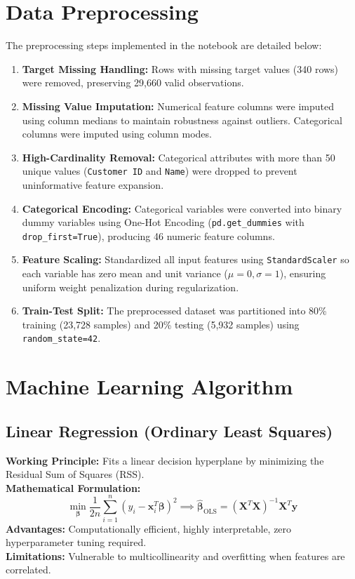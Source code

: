 \documentclass[12pt,a4paper]{article}
\begin{document}
\section{Data Preprocessing}
The preprocessing steps implemented in the notebook are detailed below:
\begin{enumerate}
    \item \textbf{Target Missing Handling:} Rows with missing target values (340 rows) were removed, preserving 29,660 valid observations.
    \item \textbf{Missing Value Imputation:} Numerical feature columns were imputed using column medians to maintain robustness against outliers. Categorical columns were imputed using column modes.
    \item \textbf{High-Cardinality Removal:} Categorical attributes with more than 50 unique values (\texttt{Customer ID} and \texttt{Name}) were dropped to prevent uninformative feature expansion.
    \item \textbf{Categorical Encoding:} Categorical variables were converted into binary dummy variables using One-Hot Encoding (\texttt{pd.get\_dummies} with \texttt{drop\_first=True}), producing 46 numeric feature columns.
    \item \textbf{Feature Scaling:} Standardized all input features using \texttt{StandardScaler} so each variable has zero mean and unit variance ($\mu=0, \sigma=1$), ensuring uniform weight penalization during regularization.
    \item \textbf{Train-Test Split:} The preprocessed dataset was partitioned into 80\% training (23,728 samples) and 20\% testing (5,932 samples) using \texttt{random\_state=42}.
\end{enumerate}

\section{Machine Learning Algorithm}

\subsection{Linear Regression (Ordinary Least Squares)}
\textbf{Working Principle:} Fits a linear decision hyperplane by minimizing the Residual Sum of Squares (RSS).\\
\textbf{Mathematical Formulation:}
\begin{equation}
    \min_{\boldsymbol{\beta}} \frac{1}{2n} \sum_{i=1}^n \left( y_i - \mathbf{x}_i^T \boldsymbol{\beta} \right)^2 \implies \hat{\boldsymbol{\beta}}_{\text{OLS}} = \left(\mathbf{X}^T \mathbf{X}\right)^{-1} \mathbf{X}^T \mathbf{y}
\end{equation}
\textbf{Advantages:} Computationally efficient, highly interpretable, zero hyperparameter tuning required.\\
\textbf{Limitations:} Vulnerable to multicollinearity and overfitting when features are correlated.
\end{document}
